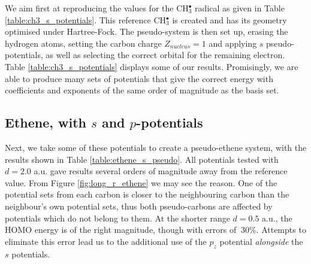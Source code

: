 \documentclass[journal=jctcce,manuscript=article]{achemso}
\begin{document}
We aim first at reproducing the values for the CH\(^{\bullet}_{3}\) radical as given in Table \ref{table:ch3_s_potentials}. This reference CH\(^{\bullet}_{3}\) is created and has its geometry optimised under Hartree-Fock. The pseudo-system is then set up, erasing the hydrogen atoms, setting the carbon charge \(Z_{nucleus} = 1\) and applying \(s\) pseudo-potentials, as well as selecting the correct orbital for the remaining electron. Table \ref{table:ch3_s_potentials} displays some of our results. Promisingly, we are able to produce many sets of potentials that give the correct energy with coefficients and exponents of the same order of magnitude as the basis set.

\subsection{Ethene, with \(s\) and \(p\)-potentials}

Next, we take some of these potentials to create a pseudo-ethene system, with the results shown in Table \ref{table:ethene_s_pseudo}. All potentials tested with \(d = 2.0\) a.u. gave results several orders of magnitude away from the reference value. From Figure \ref{fig:long_r_ethene} we may see the reason. One of the potential sets from each carbon is closer to the neighbouring carbon than the neighbour's own potential sets, thus both pseudo-carbons are affected by potentials which do not belong to them. At the shorter range \(d = 0.5\) a.u., the HOMO energy is of the right magnitude, though with errors of \(~ 30\%\). Attempts to eliminate this error lead us to the additional use of the \(p_{z}\) potential \textit{alongside} the \(s\) potentials.

\end{document}
